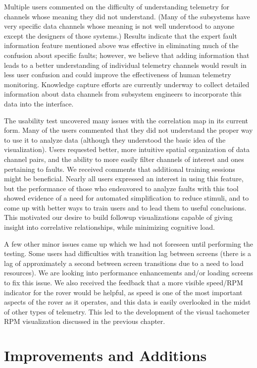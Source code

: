 Multiple users commented on the difficulty of understanding telemetry for channels whose meaning they did not understand. (Many of the subsystems have very specific data channels whose meaning is not well understood to anyone except the designers of those systems.) Results indicate that the expert fault information feature mentioned above was effective in eliminating much of the confusion about specific faults; however, we believe that adding information that leads to a better understanding of individual telemetry channels would result in less user confusion and could improve the effectiveness of human telemetry monitoring. Knowledge capture efforts are currently underway to collect detailed information about data channels from subsystem engineers to incorporate this data into the interface.

The usability test uncovered many issues with the correlation map in its current form. Many of the users commented that they did not understand the proper way to use it to analyze data (although they understood the basic idea of the visualization). Users requested better, more intuitive spatial organization of data channel pairs, and the ability to more easily filter channels of interest and ones pertaining to faults. We received comments that additional training sessions might be beneficial. Nearly all users expressed an interest in using this feature, but the performance of those who endeavored to analyze faults with this tool showed evidence of a need for automated simplification to reduce stimuli, and to come up with better ways to train users and to lead them to useful conclusions. This motivated our desire to build followup visualizations capable of giving insight into correlative relationships, while minimizing cognitive load.

A few other minor issues came up which we had not foreseen until performing the testing. Some users had difficulties with transition lag between screens (there is a lag of approximately a second between screen transitions due to a need to load resources). We are looking into performance enhancements and/or loading screens to fix this issue. We also received the feedback that a more visible speed/RPM indicator for the rover would be helpful, as speed is one of the most important aspects of the rover as it operates, and this data is easily overlooked in the midst of other types of telemetry. This led to the development of the visual tachometer RPM visualization discussed in the previous chapter.

\section{Improvements and Additions}

